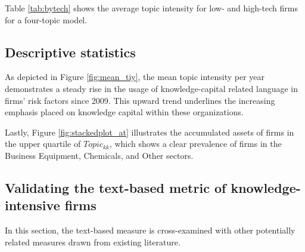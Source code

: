 \documentclass[12pt, letterpaper]{article}
\begin{document}
Table \ref{tab:bytech} shows the average topic intensity for low- and high-tech firms for a four-topic model. 




\subsection{Descriptive statistics}

As depicted in Figure \ref{fig:mean_tiy}, the mean topic intensity per year demonstrates a steady rise in the usage of knowledge-capital related language in firms' risk factors since 2009. This upward trend underlines the increasing emphasis placed on knowledge capital within these organizations.


%

Lastly, Figure \ref{fig:stackedplot_at} illustrates the accumulated assets of firms in the upper quartile of $Topic_{kk}$, which shows a clear prevalence of firms in the Business Equipment, Chemicals, and Other sectors.





\subsection{Validating the text-based metric of knowledge-intensive firms}
  
In this section, the text-based measure \tkk  is cross-examined with other potentially related measures drawn from existing literature.
\end{document}
